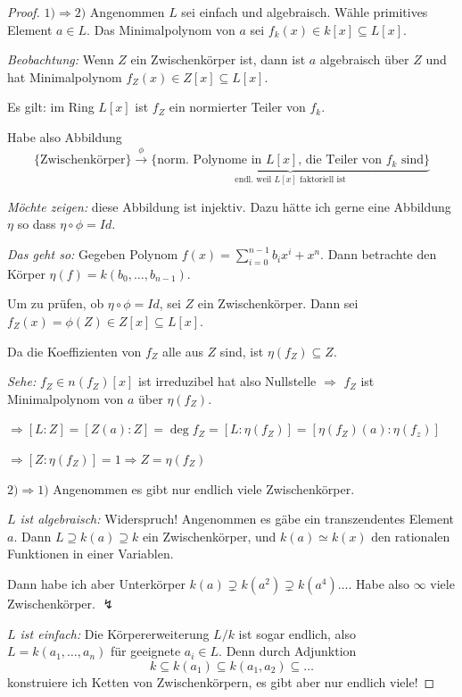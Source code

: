 \documentclass[12pt,parskip=full]{scrartcl}
\newcommand{\heading}{\underline}
\theoremstyle{definition}
\theoremstyle{remark}
\begin{document}
	\begin{proof}
		\heading{$1) \Rightarrow 2)$} Angenommen $L$ sei einfach und algebraisch. Wähle primitives Element $a \in L$. Das Minimalpolynom von $a$ sei $f_k(x) \in k[x] \subseteq L[x]$.
		
		\textit{Beobachtung:} Wenn $Z$ ein Zwischenkörper ist, dann ist $a$ algebraisch über $Z$ und hat Minimalpolynom $f_Z(x) \in Z[x] \subseteq L[x]$.
		
		Es gilt: im Ring $L[x]$ ist $f_Z$ ein normierter Teiler von $f_k$.
		
		Habe also Abbildung
		\begin{equation*}
			\{ \text{Zwischenkörper} \} \overset{\phi}{\to} \underbrace{\{ \text{norm. Polynome in $L[x]$, die Teiler von $f_k$ sind} \}}_{\text{endl. weil $L[x]$ faktoriell ist}}
		\end{equation*}
		
		\textit{Möchte zeigen:} diese Abbildung ist injektiv. Dazu hätte ich gerne eine Abbildung $\eta$ so dass $\eta \circ \phi = Id$.
		
		\textit{Das geht so:} Gegeben Polynom $f(x) = \sum_{i = 0}^{n-1} b_i x^i + x^n$. Dann betrachte den Körper $\eta(f) = k(b_0, \dots, b_{n-1})$.
		
		Um zu prüfen, ob $\eta \circ \phi = Id$, sei $Z$ ein Zwischenkörper. Dann sei $f_Z(x) = \phi(Z) \in Z[x] \subseteq L[x]$.
		
		Da die Koeffizienten von $f_Z$ alle aus $Z$ sind, ist $\eta(f_Z) \subseteq Z$.
		
		\textit{Sehe:} $f_Z \in n(f_Z)[x]$ ist irreduzibel hat also Nullstelle $\Rightarrow$ $f_Z$ ist Minimalpolynom von $a$ über $\eta(f_Z)$.
		
		$\Rightarrow [L:Z] = [Z(a):Z] = \deg f_Z = [L: \eta(f_Z)] = [\eta(f_Z)(a): \eta(f_z)]$
		
		$\Rightarrow [Z:\eta(f_Z)] = 1 \Rightarrow Z = \eta(f_Z)$
		
		\heading{$2) \Rightarrow 1)$} Angenommen es gibt nur endlich viele Zwischenkörper.
		
		\textit{$L$ ist algebraisch:} Widerspruch! Angenommen es gäbe ein transzendentes Element $a$. Dann $L \supseteq k(a) \supseteq k$ ein Zwischenkörper, und $k(a) \simeq k(x)$ den rationalen Funktionen in einer Variablen.
		
		Dann habe ich aber Unterkörper $k(a) \supsetneq k(a^2) \supsetneq k(a^4) \dots$. Habe also $\infty$ viele Zwischenkörper. $\lightning$
		
		\textit{$L$ ist einfach:} Die Körpererweiterung $L/k$ ist sogar endlich, also $L = k(a_1, \dots, a_n)$ für geeignete $a_i \in L$. Denn durch Adjunktion
		\begin{equation*}
			k \subseteq k(a_1) \subseteq k(a_1, a_2) \subseteq \dots
		\end{equation*}
		konstruiere ich Ketten von Zwischenkörpern, es gibt aber nur endlich viele!
		

\end{proof}
\end{document}
